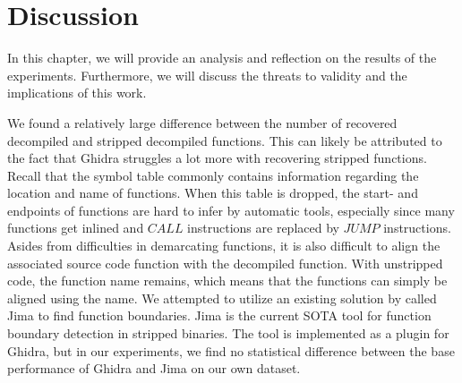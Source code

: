 \chapter{Discussion}
\label{discussion}
In this chapter, we will provide an analysis and reflection on the results of the experiments. Furthermore, we will discuss the threats to validity and the implications of this work.

We found a relatively large difference between the number of recovered decompiled and stripped decompiled functions. This can likely be attributed to the fact that Ghidra struggles a lot more with recovering stripped functions. Recall that the symbol table commonly contains information regarding the location and name of functions. When this table is dropped, the start- and endpoints of functions are hard to infer by automatic tools, especially since many functions get inlined and \(CALL\) instructions are replaced by \(JUMP\) instructions. Asides from difficulties in demarcating functions, it is also difficult to align the associated source code function with the decompiled function. With unstripped code, the function name remains, which means that the functions can simply be aligned using the name. We attempted to utilize an existing solution by \citeauthor{FunctionBoundaryDetection} called Jima \cite{FunctionBoundaryDetection} to find function boundaries. Jima is the current SOTA tool for function boundary detection in stripped binaries. The tool is implemented as a plugin for Ghidra, but in our experiments, we find no statistical difference between the base performance of Ghidra and Jima on our own dataset.

